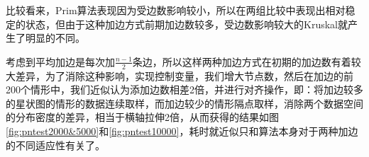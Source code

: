 \documentclass[UTF8]{ctexart}
\begin{document}
比较看来，Prim算法表现因为受边数影响较小，所以在两组比较中表现出相对稳定的状态，但由于这种加边方式前期加边数较多，受边数影响较大的Kruskal就产生了明显的不同。

考虑到平均加边是每次加\(\frac{n-1}{2}\)条边，所以这样两种加边方式在初期的加边数有着较大差异，为了消除这种影响，实现控制变量，我们增大节点数，然后在加边的前200个情形中，我们近似认为添加边数相差2倍，并进行对齐操作，即：将加边较多的星状图的情形的数据连续取样，而加边较少的情形隔点取样，消除两个数据空间的分布密度的差异，相当于横轴拉伸2倍，从而获得的结果如图\ref{fig:pntest2000&5000}和\ref{fig:pntest10000}，耗时就近似只和算法本身对于两种加边的不同适应性有关了。

\begin{figure}[htbp]
    \centering
    

\end{figure}
\end{document}
